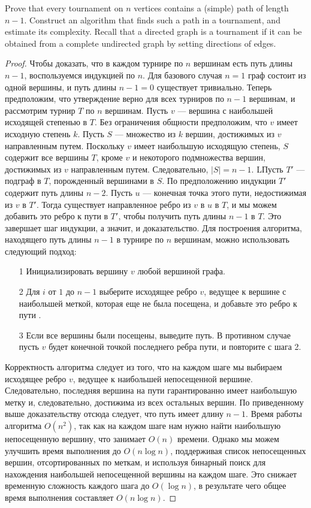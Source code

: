 \begin{prob}
Prove that every tournament on $n$ vertices contains a (simple) path of length $n-1$. Construct an algorithm that finds such a path in a tournament, and estimate its complexity.
Recall that a directed graph is a tournament if it can be obtained from a complete undirected graph by setting directions of edges.
\end{prob}
\vskip 0.2in
\begin{proof}
Чтобы доказать, что в каждом турнире по $n$ вершинам есть путь длины $n-1$, воспользуемся индукцией по $n$. Для базового случая $n=1$ граф состоит из одной вершины, и путь длины $n-1=0$ существует тривиально.
\vskip 0.1in
Теперь предположим, что утверждение верно для всех турниров по $n-1$ вершинам, и рассмотрим турнир $T$ по $n$ вершинам. Пусть $v$ — вершина с наибольшей исходящей степенью в $T$. Без ограничения общности предположим, что $v$ имеет исходную степень $k$. Пусть $S$ — множество из $k$ вершин, достижимых из $v$ направленным путем. Поскольку $v$ имеет наибольшую исходящую степень, $S$ содержит все вершины $T$, кроме $v$ и некоторого подмножества вершин, достижимых из $v$ направленным путем. Следовательно, $|S|=n-1$.
\vskip 0.1in
LПусть $T'$ — подграф в $T$, порожденный вершинами в $S$. По предположению индукции $T'$ содержит путь длины $n-2$. Пусть $u$ — конечная точка этого пути, недостижимая из $v$ в $T'$. Тогда существует направленное ребро из $v$ в $u$ в $T$, и мы можем добавить это ребро к пути в $T'$, чтобы получить путь длины $n-1$ в $T$. Это завершает шаг индукции, а значит, и доказательство.
\vskip 0.1in
Для построения алгоритма, находящего путь длины $n-1$ в турнире по $n$ вершинам, можно использовать следующий подход:
\begin{itemize}
\item[1] Инициализировать вершину $v$ любой вершиной графа.
\item[2] Для $i$ от $1$ до $n-1$ выберите исходящее ребро $v$, ведущее к вершине с наибольшей меткой, которая еще не была посещена, и добавьте это ребро к пути .
\item[3] Если все вершины были посещены, выведите путь. В противном случае пусть $v$ будет конечной точкой последнего ребра пути, и повторите с шага 2.
\end{itemize}
Корректность алгоритма следует из того, что на каждом шаге мы выбираем исходящее ребро $v$, ведущее к наибольшей непосещенной вершине. Следовательно, последняя вершина на пути гарантированно имеет наибольшую метку и, следовательно, достижима из всех остальных вершин. По приведенному выше доказательству отсюда следует, что путь имеет длину $n-1$.
\vskip 0.1in
Время работы алгоритма $O(n^2)$, так как на каждом шаге нам нужно найти наибольшую непосещенную вершину, что занимает $O(n)$ времени. Однако мы можем улучшить время выполнения до $O(n\log n)$, поддерживая список непосещенных вершин, отсортированных по меткам, и используя бинарный поиск для нахождения наибольшей непосещенной вершины на каждом шаге. Это снижает временную сложность каждого шага до $O(\log n)$, в результате чего общее время выполнения составляет $O(n\log n)$.
\end{proof}
\vskip 0.6in

